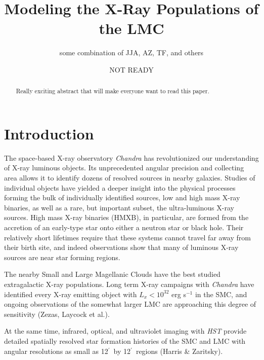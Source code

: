 \documentclass[12pt, preprint]{aastex}
\newcommand{\amin}{\ifmmode {^{\prime}\ }\else$^{\prime}$\fi}
\begin{document}
\title{Modeling the X-Ray Populations of the LMC}
\author{some combination of JJA, AZ, TF, and others}
\date{NOT READY}

\begin{abstract}
Really exciting abstract that will make everyone want to read this paper.
\end{abstract}

\section{Introduction}

The space-based X-ray observatory {\it Chandra} has revolutionized our understanding of X-ray luminous objects. Its unprecedented angular precision and collecting area allows it to identify dozens of resolved sources in nearby galaxies. Studies of individual objects have yielded a deeper insight into the physical processes forming the bulk of individually identified sources, low and high mass X-ray binaries, as well as a rare, but important subset, the ultra-luminous X-ray sources. High mass X-ray binaries (HMXB), in particular, are formed from the accretion of an early-type star onto either a neutron star or black hole. Their relatively short lifetimes require that these systems cannot travel far away from their birth site, and indeed observations show that many of luminous X-ray sources are near star forming regions. 

The nearby Small and Large Magellanic Clouds have the best studied extragalactic X-ray populations. Long term X-ray campaigns with {\it Chandra} have identified every X-ray emitting object with $L_x < 10^{32}$ erg s$^{-1}$ in the SMC, and ongoing observations of the somewhat larger LMC are approaching this degree of sensitivity (Zezas, Laycock et al.). 

At the same time, infrared, optical, and ultraviolet imaging with {\it HST} provide detailed spatially resolved star formation histories of the SMC and LMC with angular resolutions as small as 12\amin\ by 12\amin\ regions (Harris \& Zaritsky). 
\end{document}
